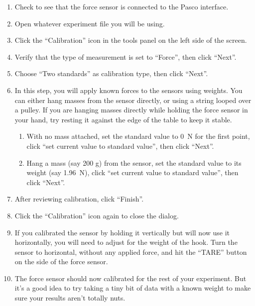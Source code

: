 \begin{enumerate}
\item Check to see that the force sensor is connected to the Pasco interface.

\item Open whatever experiment file you will be using.

\item Click the ``Calibration'' icon in the tools panel on the left side of the screen.

\item Verify that the type of measurement is set to ``Force'', then click ``Next''.

\item Choose ``Two standards'' as calibration type, then click ``Next''.

\item In this step, you will apply known forces to the sensors using weights.  You can either hang masses from the sensor directly, or using a string looped over a pulley.  If you are hanging masses directly while holding the force sensor in your hand, try resting it against the edge of the table to keep it stable.

\begin{enumerate}

\item With no mass attached, set the standard value to 0~N for the first point, click ``set current value to standard value'', then click ``Next''.

\item Hang a mass (say 200 g) from the sensor, set the standard value to its weight (say 1.96~N), click ``set current value to standard value'', then click ``Next''.

\end{enumerate}

\item After reviewing calibration, click ``Finish''.

\item Click the ``Calibration'' icon again to close the dialog. 

\item If you calibrated the sensor by holding it vertically but will now use it horizontally, you will need to adjust for the weight of the hook.  Turn the sensor to horizontal, without any applied force, and hit the ``TARE'' button on the side of the force sensor.

\item The force sensor should now calibrated for the rest of your experiment.  But it's a good idea to try taking a tiny bit of data with a known weight to make sure your results aren't totally nuts.

\end{enumerate}
